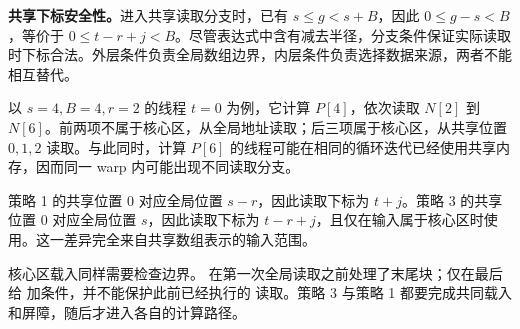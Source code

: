 \textbf{共享下标安全性。}进入共享读取分支时，已有 $s\le g<s+B$，因此 $0\le g-s<B$，等价于 $0\le t-r+j<B$。尽管表达式中含有减去半径，分支条件保证实际读取时下标合法。外层条件负责全局数组边界，内层条件负责选择数据来源，两者不能相互替代。

以 $s=4,B=4,r=2$ 的线程 $t=0$ 为例，它计算 $P[4]$，依次读取 $N[2]$ 到 $N[6]$。前两项不属于核心区，从全局地址读取；后三项属于核心区，从共享位置 $0,1,2$ 读取。与此同时，计算 $P[6]$ 的线程可能在相同的循环迭代已经使用共享内存，因而同一 warp 内可能出现不同读取分支。

\begin{keybox}[title={两种共享数组起点决定两种计算下标}]
策略 1 的共享位置 $0$ 对应全局位置 $s-r$，因此读取下标为 $t+j$。策略 3 的共享位置 $0$ 对应全局位置 $s$，因此读取下标为 $t-r+j$，且仅在输入属于核心区时使用。这一差异完全来自共享数组表示的输入范围。
\end{keybox}

核心区载入同样需要检查边界。  在第一次全局读取之前处理了末尾块；仅在最后给  加条件，并不能保护此前已经执行的  读取。策略 3 与策略 1 都要完成共同载入和屏障，随后才进入各自的计算路径。
\FloatBarrier
